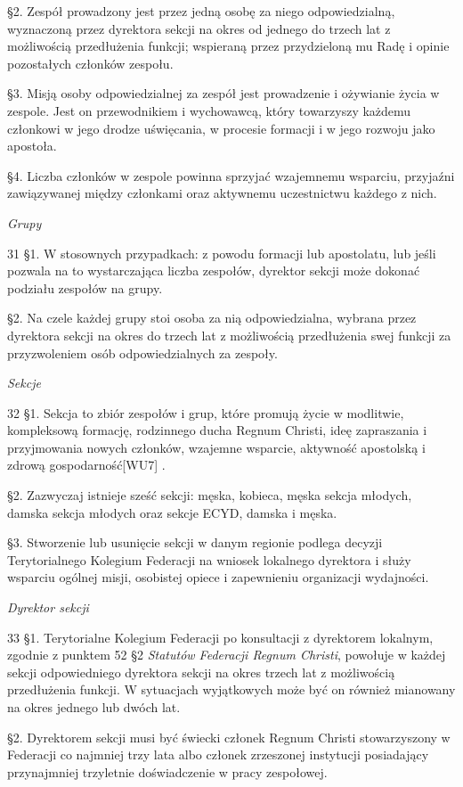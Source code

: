 ﻿\documentclass{report}
\newcommand{\lett}[1]{\lettrine[findent=6pt]{#1}{}}
\newcommand{\ssec}[1]{\vspace{1em}\textit{#1}\vspace{.5em}\nopagebreak}
\begin{document}
\S{}2. Zespół prowadzony jest przez jedną osobę za niego odpowiedzialną, wyznaczoną przez dyrektora sekcji na okres od jednego do trzech lat z możliwością przedłużenia funkcji; wspieraną przez przydzieloną mu Radę i opinie pozostałych członków zespołu.


\S{}3. Misją osoby odpowiedzialnej za zespół jest prowadzenie i ożywianie życia w zespole. Jest on przewodnikiem i wychowawcą, który towarzyszy każdemu członkowi w jego drodze uświęcania, w procesie formacji i w jego rozwoju jako apostoła.


\S{}4. Liczba członków w zespole powinna sprzyjać wzajemnemu wsparciu, przyjaźni zawiązywanej między członkami oraz aktywnemu uczestnictwu każdego z nich.
 
\ssec{Grupy}


\lett{31} \S{}1. W stosownych przypadkach: z powodu formacji lub apostolatu, lub jeśli pozwala na to wystarczająca liczba zespołów, dyrektor sekcji może dokonać podziału zespołów na grupy.


\S{}2. Na czele każdej grupy stoi osoba za nią odpowiedzialna, wybrana przez dyrektora sekcji na okres do trzech lat z możliwością przedłużenia swej funkcji za przyzwoleniem osób odpowiedzialnych za zespoły.
 
\ssec{Sekcje}


\lett{32} \S{}1. Sekcja to zbiór zespołów i grup, które promują życie w modlitwie, kompleksową formację, rodzinnego ducha Regnum Christi, ideę zapraszania i przyjmowania nowych członków, wzajemne wsparcie, aktywność apostolską i zdrową gospodarność[WU7] .


\S{}2. Zazwyczaj istnieje sześć sekcji: męska, kobieca, męska sekcja młodych, damska sekcja młodych oraz sekcje ECYD, damska i męska.


\S{}3. Stworzenie lub usunięcie sekcji w danym regionie podlega decyzji Terytorialnego Kolegium Federacji na wniosek lokalnego dyrektora i służy wsparciu ogólnej misji, osobistej opiece i zapewnieniu organizacji wydajności.


\ssec{Dyrektor sekcji}
 
\lett{33} \S{}1. Terytorialne Kolegium Federacji po konsultacji z dyrektorem lokalnym, zgodnie z punktem 52 \S{}2 {\em Statutów Federacji Regnum Christi}, powołuje w każdej sekcji odpowiedniego dyrektora sekcji na okres trzech lat z możliwością przedłużenia funkcji. W sytuacjach wyjątkowych może być on również mianowany na okres jednego lub dwóch lat.


\S{}2.  Dyrektorem sekcji musi być świecki członek Regnum Christi stowarzyszony w Federacji co najmniej trzy lata albo członek zrzeszonej instytucji posiadający przynajmniej trzyletnie doświadczenie w pracy zespołowej.
\end{document}
